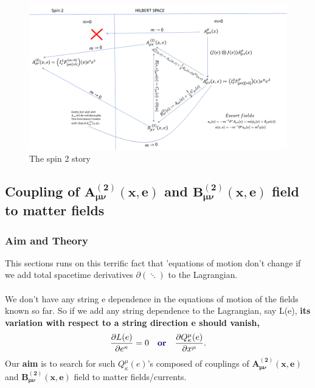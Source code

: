 \documentclass[12pt,a4paper]{article}
\numberwithin{equation}{section}
\begin{document}
\begin{figure}[H]
\includegraphics[scale=0.5]{2}
\caption{The spin 2 story}
\end{figure}


\subsection{Coupling of $\boldsymbol{A^{(2)}_{\mu\nu}(x,e)}$ and $\boldsymbol{B^{(2)}_{\mu\nu}(x,e)}$ field to matter fields}
\subsubsection{Aim and Theory}
This sections runs on this terrific fact that 'equations of motion don't change if we add total spacetime derivatives $\partial(\ddots)$ to the Lagrangian. \\\\
We don't have any string e dependence in the equations of motion of the fields known so far. So if we add any string dependence to the Lagrangian, say L(e), \textbf{\textcolor{blue!50!black}{its variation with respect to a string direction e should vanish,}}
\begin{align}
\frac{\partial L(e)}{\partial e^\kappa}=0 \quad \textbf{\textcolor{blue!50!black}{or}}\quad \frac{\partial Q^\mu_\kappa(e)}{\partial x^\mu}.
\end{align} 
Our \textbf{\textcolor{blue!50!black}{aim}} is to search for such $Q^\mu_\kappa(e)$'s composed of couplings of $\boldsymbol{A^{(2)}_{\mu\nu}(x,e)}$ and $\boldsymbol{B^{(2)}_{\mu\nu}(x,e)}$ field to matter fields/currents.
\end{document}
